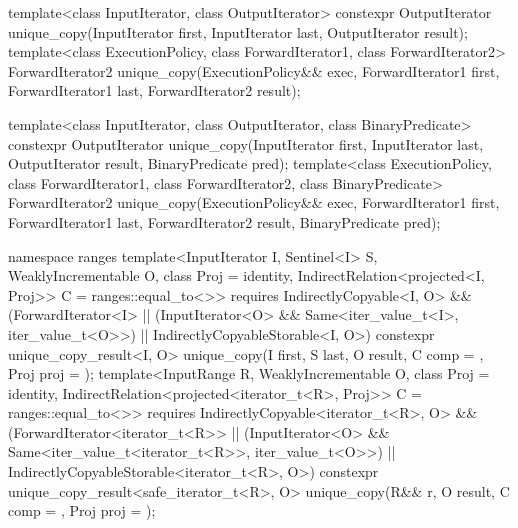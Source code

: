 %
\begin{itemdecl}
template<class InputIterator, class OutputIterator>
  constexpr OutputIterator
    unique_copy(InputIterator first, InputIterator last,
                OutputIterator result);
template<class ExecutionPolicy, class ForwardIterator1, class ForwardIterator2>
  ForwardIterator2
    unique_copy(ExecutionPolicy&& exec,
                ForwardIterator1 first, ForwardIterator1 last,
                ForwardIterator2 result);

template<class InputIterator, class OutputIterator,
         class BinaryPredicate>
  constexpr OutputIterator
    unique_copy(InputIterator first, InputIterator last,
                OutputIterator result, BinaryPredicate pred);
template<class ExecutionPolicy, class ForwardIterator1, class ForwardIterator2,
         class BinaryPredicate>
  ForwardIterator2
    unique_copy(ExecutionPolicy&& exec,
                ForwardIterator1 first, ForwardIterator1 last,
                ForwardIterator2 result, BinaryPredicate pred);

namespace ranges {
  template<InputIterator I, Sentinel<I> S, WeaklyIncrementable O,
      class Proj = identity, IndirectRelation<projected<I, Proj>> C = ranges::equal_to<>>
    requires IndirectlyCopyable<I, O> &&
      (ForwardIterator<I> ||
      (InputIterator<O> && Same<iter_value_t<I>, iter_value_t<O>>) ||
      IndirectlyCopyableStorable<I, O>)
    constexpr unique_copy_result<I, O>
      unique_copy(I first, S last, O result, C comp = {}, Proj proj = {});
  template<InputRange R, WeaklyIncrementable O, class Proj = identity,
      IndirectRelation<projected<iterator_t<R>, Proj>> C = ranges::equal_to<>>
    requires IndirectlyCopyable<iterator_t<R>, O> &&
      (ForwardIterator<iterator_t<R>> ||
      (InputIterator<O> && Same<iter_value_t<iterator_t<R>>, iter_value_t<O>>) ||
      IndirectlyCopyableStorable<iterator_t<R>, O>)
    constexpr unique_copy_result<safe_iterator_t<R>, O>
      unique_copy(R&& r, O result, C comp = {}, Proj proj = {});
}
\end{itemdecl}

